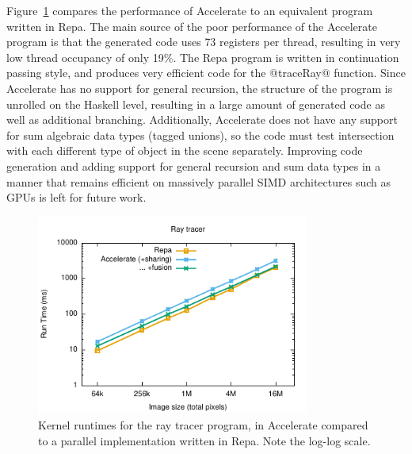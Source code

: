 Figure~\ref{fig:ray} compares the performance of Accelerate to an equivalent
program written in Repa. The main source of the poor performance of the
Accelerate program is that the generated code uses 73 registers per thread,
resulting in very low thread occupancy of only 19\%. The Repa program is written
in continuation passing style, and produces very efficient code for the
@traceRay@ function. Since Accelerate has no support for general recursion, the
structure of the program is unrolled on the Haskell level, resulting in a large
amount of generated code as well as additional branching.
Additionally, Accelerate does not have any support for sum
algebraic data types (tagged unions), so the code must test intersection with
each different type of object in the scene separately. Improving code generation
and adding support for general recursion and sum data types in a manner that
remains efficient on massively parallel SIMD architectures such as GPUs is left
for future work.

\begin{figure}
    \begin{center}
        \includegraphics[width=0.8\textwidth]{images/results/ray/ray}
    \end{center}
    \caption[Ray tracing kernel benchmarks]{Kernel runtimes for the ray tracer
        program, in Accelerate compared to a parallel implementation written in
    Repa. Note the log-log scale.}
\label{fig:ray}
\end{figure}


